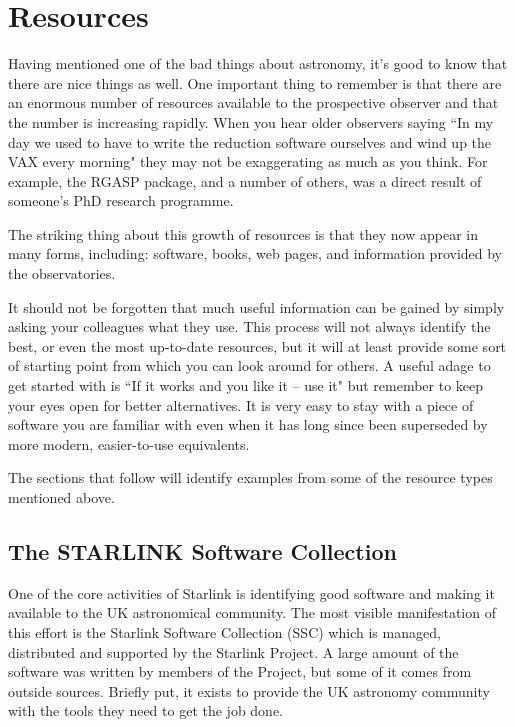 \documentclass[twoside,11pt]{article}
\newcommand{\htmladdnormallink}[2]{#1}
\newcommand{\xref}[3]{#1}
\newcommand{\xlabel}[1]{}
\newcommand{\STARLINKref}{\htmladdnormallink{Starlink}{http://www.starlink.ac.uk/}}
\newcommand{\SSCref}{\xref{SSC}{sun1}{}}
\begin{document}
\section{Resources} \xlabel{RESOURCES}
\label{sec:resources}

Having mentioned one of the bad things about astronomy, it's good to know that
there are nice things as well. One important thing to remember is that there
are an enormous number of resources available to the prospective observer and
that the number is increasing rapidly. When you hear older observers saying
``In my day we used to have to write the reduction software ourselves and wind
up the VAX every morning" they may not be exaggerating as much as you think.
For example, the RGASP package, and a number of others, was a direct result of
someone's PhD research programme.

The striking thing about this growth of resources is that they now appear in
many forms, including: software, books, web pages, and information provided by
the observatories.

It should not be forgotten that much useful information can be gained by
simply asking your colleagues what they use. This process will not always
identify the best, or even the most up-to-date resources, but it will at
least provide some sort of starting point from which you can look around for
others. A useful adage to get started with is ``If it works and you like it --
use it" but remember to keep your eyes open for better alternatives. It is
very easy to stay with a piece of software you are familiar with even when it
has long since been superseded by more modern, easier-to-use equivalents.

The sections that follow will identify examples from some of the
resource types mentioned above.


\subsection{The STARLINK Software Collection} \xlabel{STARLINK}
\label{sec:starlink}

One of the core activities of {\STARLINKref} is identifying
good software and making it available to the UK astronomical
community. The most visible manifestation of this
effort is the Starlink Software Collection ({\SSCref}) which is managed,
distributed and supported by the Starlink Project. A large amount of the
software was written by members of the Project, but some of it comes from
outside sources. Briefly put, it exists to provide the UK astronomy
community with the tools they need to get the job done.
\end{document}
